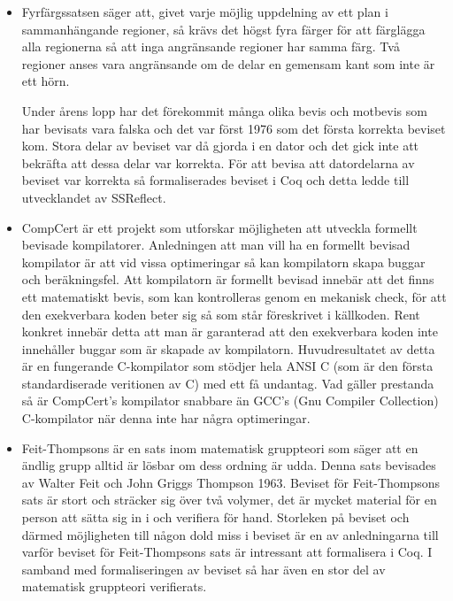 \begin{itemize}

\item Fyrfärgssatsen\autocite{gonthier2008formal} säger att, givet varje möjlig
uppdelning av ett plan i sammanhängande regioner, så krävs det högst fyra
färger för att färglägga alla regionerna så att inga angränsande regioner har
samma färg. Två regioner anses vara angränsande om de delar en gemensam kant
som inte är ett hörn.

Under årens lopp har det förekommit många olika bevis och motbevis som har
bevisats vara falska och  det var först 1976 som det första korrekta beviset
kom. Stora delar av beviset var då gjorda i en dator och det gick inte att
bekräfta att dessa delar var korrekta. För att bevisa att datordelarna av
beviset var korrekta så formaliserades beviset i Coq och detta ledde till
utvecklandet av SSReflect.

\item CompCert\autocite{compcert} är ett projekt som utforskar möjligheten att
utveckla formellt bevisade kompilatorer. Anledningen att man vill ha en
formellt bevisad kompilator är att vid vissa optimeringar så kan kompilatorn
skapa buggar och beräkningsfel. Att kompilatorn är formellt bevisad innebär att
det finns ett matematiskt bevis, som kan kontrolleras genom en mekanisk check,
för att den exekverbara koden beter sig så som står föreskrivet i källkoden.
Rent konkret innebär detta att man är garanterad att den exekverbara koden inte
innehåller buggar som är skapade av kompilatorn. Huvudresultatet av detta
är en fungerande C-kompilator som stödjer hela ANSI C (som är den första
standardiserade veritionen av C) med ett få undantag.
Vad gäller prestanda så är CompCert's kompilator snabbare än
GCC's (Gnu Compiler Collection) C-kompilator när denna inte
har några optimeringar.


\item Feit-Thompsons är en sats inom matematisk gruppteori som säger att en
ändlig grupp alltid är lösbar om dess ordning är
udda\cite{aschbacher2004status}. Denna sats bevisades av Walter Feit och John
Griggs Thompson 1963. Beviset för Feit-Thompsons sats är stort och sträcker sig
över två volymer, det är mycket material för en person att sätta sig in i och
verifiera för hand. Storleken på beviset och därmed möjligheten till någon dold
miss i beviset är en av anledningarna till varför beviset för Feit-Thompsons
sats är intressant att formalisera i Coq. I samband med formaliseringen av
beviset så har även en stor del av matematisk gruppteori verifierats.

\end{itemize}

